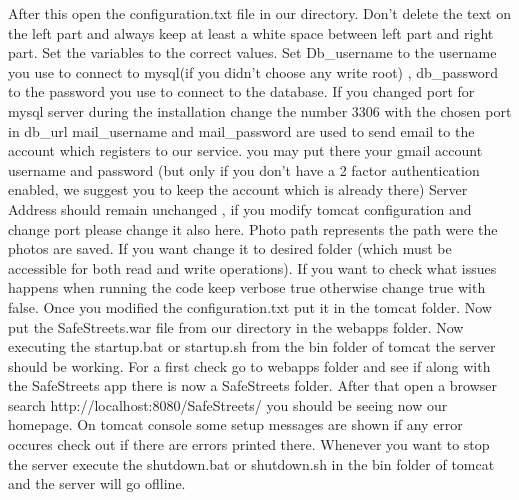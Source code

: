After this open the configuration.txt file in our directory.
Don't delete the text on the left part and always keep at least a white space between left part and right part.
Set the variables to the correct values. 
Set Db\_username to the username you use to connect to mysql(if you didn't choose any write root) , db\_password to the password you use to connect to the database. If you changed port for mysql server during the installation change the number 3306 with the chosen port in db\_url mail\_username and mail\_password are used to send email to the account which registers to our service. you may put there your gmail account username and password (but only if you don't have a 2 factor authentication enabled, we suggest you to keep the account which is already there)
Server Address should remain unchanged ,  if you modify tomcat configuration and change port please change it also here.
Photo path represents the path were the photos are saved. If you want change it to desired folder (which must be accessible for both read and write operations).
If you want to check what issues happens when running the code keep verbose true  otherwise change true with false. Once you modified the configuration.txt put it in the tomcat  folder.
Now put the SafeStreets.war file from our directory in the webapps folder. Now executing the startup.bat or startup.sh from the bin folder of tomcat the server should be working.
For a first check go to webapps folder and see if along with the SafeStreets app there is now a SafeStreets folder. After that open a browser search  http://localhost:8080/SafeStreets/ you should be seeing now our homepage.
On tomcat console some setup messages are shown if any error occures check out if there are errors printed there.
Whenever you want to stop the server execute the shutdown.bat or shutdown.sh in the bin folder of tomcat and the server will go oflline.